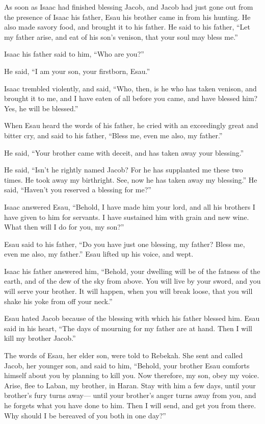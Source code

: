  As soon as Isaac had finished blessing Jacob, and Jacob
had just gone out from the presence of Isaac his father, Esau his
brother came in from his hunting.  He also made savory
food, and brought it to his father. He said to his father, ``Let my
father arise, and eat of his son's venison, that your soul may bless
me.''

 Isaac his father said to him, ``Who are you?''

He said, ``I am your son, your firstborn, Esau.''

 Isaac trembled violently, and said, ``Who, then, is he who
has taken venison, and brought it to me, and I have eaten of all before
you came, and have blessed him? Yes, he will be blessed.''

 When Esau heard the words of his father, he cried with an
exceedingly great and bitter cry, and said to his father, ``Bless me,
even me also, my father.''

 He said, ``Your brother came with deceit, and has taken
away your blessing.''

 He said, ``Isn't he rightly named Jacob? For he has
supplanted me these two times. He took away my birthright. See, now he
has taken away my blessing.'' He said, ``Haven't you reserved a blessing
for me?''

 Isaac answered Esau, ``Behold, I have made him your lord,
and all his brothers I have given to him for servants. I have sustained
him with grain and new wine. What then will I do for you, my son?''

 Esau said to his father, ``Do you have just one blessing,
my father? Bless me, even me also, my father.'' Esau lifted up his
voice, and wept.

 Isaac his father answered him, ``Behold, your dwelling
will be of the fatness of the earth, and of the dew of the sky from
above.  You will live by your sword, and you will serve
your brother. It will happen, when you will break loose, that you will
shake his yoke from off your neck.''

 Esau hated Jacob because of the blessing with which his
father blessed him. Esau said in his heart, ``The days of mourning for
my father are at hand. Then I will kill my brother Jacob.''

 The words of Esau, her elder son, were told to Rebekah.
She sent and called Jacob, her younger son, and said to him, ``Behold,
your brother Esau comforts himself about you by planning to kill you.
 Now therefore, my son, obey my voice. Arise, flee to
Laban, my brother, in Haran.  Stay with him a few days,
until your brother's fury turns away---  until your
brother's anger turns away from you, and he forgets what you have done
to him. Then I will send, and get you from there. Why should I be
bereaved of you both in one day?''

